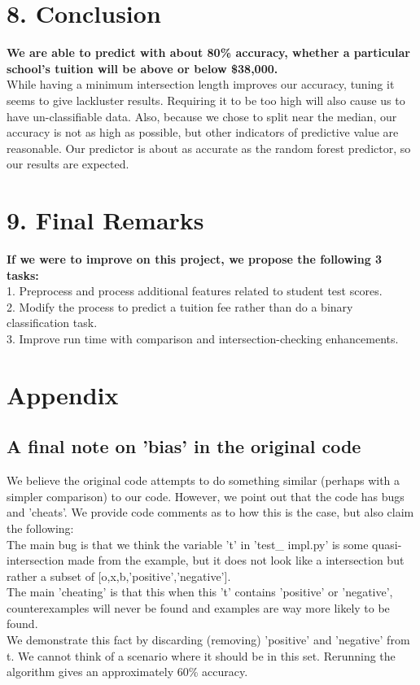 \documentclass[12pt, a4, epsf] {article}
\theoremstyle{plain}
\theoremstyle{definition}
\begin{document}
\section*{8. Conclusion}
\textbf{We are able to predict with about 80\% accuracy, whether a particular school's tuition will be above or below \$38,000. }\\
While having a minimum intersection length improves our accuracy, tuning it seems to give lackluster results. Requiring it to be too high will also cause us to have un-classifiable data. Also, because we chose to split near the median, our accuracy is not as high as possible, but other indicators of predictive value are reasonable. Our predictor is about as accurate as the random forest predictor, so our results are expected.\\
\section*{9. Final Remarks}
\textbf{If we were to improve on this project, we propose the following 3 tasks:}\\
1. Preprocess and process additional features related to student test scores.\\
2. Modify the process to predict a tuition fee rather than do a binary classification task.\\
3. Improve run time with comparison and intersection-checking enhancements.

\section*{Appendix}
\subsection*{A final note on 'bias' in the original code}
We believe the original code attempts to do something similar (perhaps with a simpler comparison) to our code. However, we point out that the code has bugs and 'cheats'. We provide code comments as to how this is the case, but also claim the following:\\
The main bug is that we think the variable 't' in 'test\_ impl.py' is some quasi-intersection made from the example, but it does not look like a intersection but rather a subset of [o,x,b,'positive','negative'].\\
The main 'cheating' is that this when this 't' contains 'positive' or 'negative', counterexamples will never be found and examples are way more likely to be found.\\
We demonstrate this fact by discarding (removing) 'positive' and 'negative' from t. We cannot think of a scenario where it should be in this set. Rerunning the algorithm gives an approximately 60\% accuracy.
\end{document}
